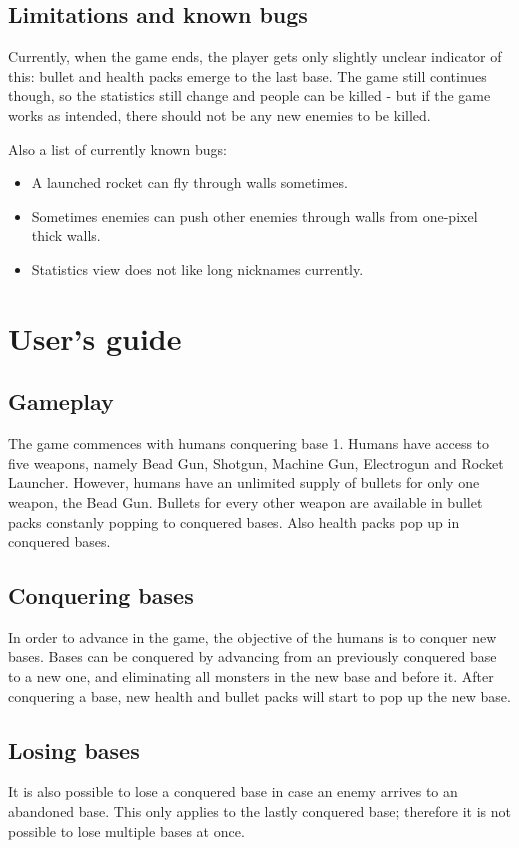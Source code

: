 \documentclass[a4paper,12pt,titlepage]{article}
\begin{document}
\subsection {Limitations and known bugs}
Currently, when the game ends, the player gets only slightly unclear indicator
of this: bullet and health packs emerge to the last base. The game still
continues though, so the statistics still change and people can be killed - but
if the game works as intended, there should not be any new enemies to be killed.

Also a list of currently known bugs:
\begin{itemize}
\item A launched rocket can fly through walls sometimes.
\item Sometimes enemies can push other enemies through walls from one-pixel thick
walls.
\item Statistics view does not like long nicknames currently.
\end{itemize}


\section{User's guide}

\subsection{Gameplay}
The game commences with humans conquering base 1. Humans have access to five weapons, namely Bead Gun, Shotgun, Machine Gun, Electrogun and Rocket Launcher. However, humans have an unlimited supply of bullets for only one weapon, the Bead Gun. Bullets for every other weapon are available in bullet packs constanly popping to conquered bases. Also health packs pop up in conquered bases.

\subsection{Conquering bases}
In order to advance in the game, the objective of the humans is to conquer new bases. Bases can be conquered by advancing from an previously conquered base to a new one, and eliminating all monsters in the new base and before it. After conquering a base, new health and bullet packs will start to pop up the new base.

\subsection{Losing bases}
It is also possible to lose a conquered base in case an enemy arrives to an abandoned base. This only applies to the lastly conquered base; therefore it is not possible to lose multiple bases at once.
\end{document}
